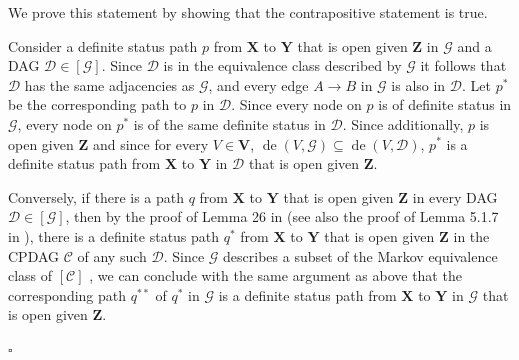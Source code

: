 \documentclass[11pt,a4paper]{article}
\theoremstyle{definition}
\theoremstyle{remark}
\newenvironment{proofof}[1][]{\begin{trivlist}
\item[\hskip \labelsep {\textit{Proof of #1.}}]}{\hfill{}$\square$\end{trivlist}}
\DeclareMathOperator{\de}{de}
\newcommand{\g}[1][G]{\mathcal{#1}}
\begin{document}
 \begin{proofof}[Lemma  \ref{lemma:dsepp1}]
 	
   We prove this statement by showing that the contrapositive statement is true. 
 	
 	Consider a definite status path $p$ from $\mathbf{X}$ to $\mathbf{Y}$ that is open given $\mathbf{Z}$ in $\g$ and a DAG $\g[D] \in [\g]$. Since $\g[D]$ is in the equivalence class described by  $\g$ it follows that $\g[D]$ has the same adjacencies as $\g$, and every edge $A \rightarrow B$ in $\g$ is also in $\g[D]$. 
 	Let $p^*$ be the corresponding path to $p$ in $\g[D]$. 
 	Since every node on $p$ is of definite status in $\g$, every node on $p^*$ is of the same definite status in $\g[D]$. Since additionally, $p$ is  open given $\mathbf{Z}$ and since for every $V \in \mathbf{V}$, $\de(V,\g) \subseteq \de(V,\g[D])$, $p^*$ is a definite status path from $\mathbf{X}$ to $\mathbf{Y}$ in $\g[D]$ that is open given $\mathbf{Z}$.
 	
 	Conversely, if there is a path $q$ from  $\mathbf{X}$ to $\mathbf{Y}$ that is open given $\mathbf{Z}$  in every DAG $\g[D] \in [\g]$, then by the proof of Lemma 26 in \citet{zhang2008causal} (see also the proof of Lemma 5.1.7 in \citealp{zhang2006causal}), there is a definite status path $q^*$ from $\mathbf{X}$ to $\mathbf{Y}$ that is open given $\mathbf{Z}$ in the CPDAG $\g[C]$ of any such $\g[D]$. 
 	Since $\g$ describes a subset of the Markov equivalence class of $[\g[C]]$ \citep{meek1995causal}, we can conclude with the same argument as above that the corresponding path $q^{**}$ of $q^*$ in $\g$ is a definite status path from $\mathbf{X}$ to $\mathbf{Y}$ in $\g$ that is open given $\mathbf{Z}$.
 	
 	
 \end{proofof}


	
\end{document}
